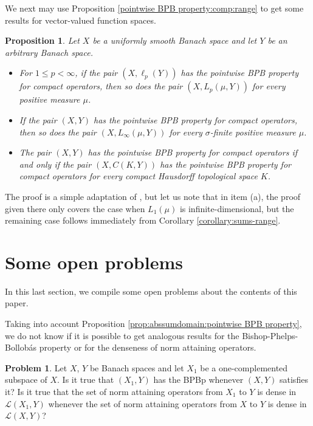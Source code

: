 \documentclass[a4paper,10pt]{amsart}
\theoremstyle{plain}
\newtheorem{proposition}[theorem]{Proposition}
\theoremstyle{definition}
\newtheorem{problem}[theorem]{Problem}
\renewcommand{\leq}{\leqslant}
\begin{document}
We next may use Proposition \ref{pointwise BPB property:comp:range} to get some results for vector-valued function spaces.

\begin{proposition} \label{pointwise BPB property:comp:range2} Let $X$ be a uniformly smooth Banach space and let $Y$ be an arbitrary Banach space.
\begin{itemize}
\item[(a)]	For $1 \leq p < \infty$, if the pair $(X, \ell_p(Y))$ has the pointwise BPB property for compact operators, then so does the pair $(X, L_p(\mu, Y))$ for every positive measure $\mu$.
\item[(b)] If the pair $(X, Y)$ has the pointwise BPB property for compact operators, then so does the pair $(X, L_{\infty}(\mu, Y))$ for every $\sigma$-finite positive measure $\mu$.
\item[(c)] The pair $(X, Y)$ has the pointwise BPB property for compact operators if and only if the pair $(X, C(K, Y))$ has the pointwise BPB property for compact operators for every compact Hausdorff topological space $K$.	
\end{itemize}	
\end{proposition}

The proof is a simple adaptation of \cite[Theorem 3.15]{DGMM}, but let us note that in item (a), the proof given there only covers the case when $L_1(\mu)$ is infinite-dimensional, but the remaining case follows immediately from Corollary \ref{corollary:sums-range}.


\section{Some open problems}


In this last section, we compile some open problems about the contents of this paper.


Taking into account Proposition \ref{prop:abssumdomain:pointwise BPB property}, we do not know if it is possible to get analogous results for the Bishop-Phelps-Bollob\'as property or for the denseness of norm attaining operators.

\begin{problem} Let $X$, $Y$ be Banach spaces and let $X_1$ be a one-complemented subspace of $X$. Is it true that $(X_1, Y)$ has the BPBp whenever $(X, Y)$ satisfies it? Is it true that the set of norm attaining operators from $X_1$ to $Y$ is dense in $\mathcal{L}(X_1,Y)$ whenever the set of norm attaining operators from $X$ to $Y$ is dense in $\mathcal{L}(X,Y)$?
\end{problem}
\end{document}
